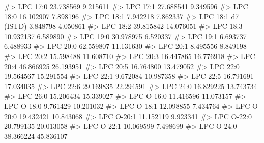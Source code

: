 \documentclass[
  letterpaper,
  DIV=11,
  numbers=noendperiod]{scrreprt}
\newenvironment{Shaded}{\begin{snugshade}}{\end{snugshade}}
\newcommand{\CommentTok}[1]{\textcolor[rgb]{0.37,0.37,0.37}{#1}}
\begin{document}
\begin{Shaded}
\begin{Highlighting}[]
\CommentTok{\#\textgreater{} LPC 17:0                                  23.738569  9.215611}
\CommentTok{\#\textgreater{} LPC 17:1                                  27.688541  9.349596}
\CommentTok{\#\textgreater{} LPC 18:0                                  16.102907  7.898196}
\CommentTok{\#\textgreater{} LPC 18:1                                   7.942218  7.862337}
\CommentTok{\#\textgreater{} LPC 18:1 d7 (ISTD)                         3.848798  4.050861}
\CommentTok{\#\textgreater{} LPC 18:2                                  39.815842 14.076051}
\CommentTok{\#\textgreater{} LPC 18:3                                  10.932137  6.589890}
\CommentTok{\#\textgreater{} LPC 19:0                                  30.978975  6.520337}
\CommentTok{\#\textgreater{} LPC 19:1                                   6.693737  6.488933}
\CommentTok{\#\textgreater{} LPC 20:0                                  62.559807 11.131630}
\CommentTok{\#\textgreater{} LPC 20:1                                   8.495556  8.849198}
\CommentTok{\#\textgreater{} LPC 20:2                                  15.598488 11.608710}
\CommentTok{\#\textgreater{} LPC 20:3                                  16.447865 16.776918}
\CommentTok{\#\textgreater{} LPC 20:4                                  46.866925 26.193951}
\CommentTok{\#\textgreater{} LPC 20:5                                  16.764800 13.479052}
\CommentTok{\#\textgreater{} LPC 22:0                                  19.564567 15.291554}
\CommentTok{\#\textgreater{} LPC 22:1                                   9.672084 10.987358}
\CommentTok{\#\textgreater{} LPC 22:5                                  16.791691 17.034035}
\CommentTok{\#\textgreater{} LPC 22:6                                  29.169835 22.294591}
\CommentTok{\#\textgreater{} LPC 24:0                                  16.829225 13.743734}
\CommentTok{\#\textgreater{} LPC 26:0                                  15.206434 15.339027}
\CommentTok{\#\textgreater{} LPC O{-}16:0                                11.416596 11.073157}
\CommentTok{\#\textgreater{} LPC O{-}18:0                                 9.761429 10.201032}
\CommentTok{\#\textgreater{} LPC O{-}18:1                                12.098855  7.434764}
\CommentTok{\#\textgreater{} LPC O{-}20:0                                19.432421 10.843068}
\CommentTok{\#\textgreater{} LPC O{-}20:1                                11.152119  9.923341}
\CommentTok{\#\textgreater{} LPC O{-}22:0                                20.799135 20.013058}
\CommentTok{\#\textgreater{} LPC O{-}22:1                                10.069599  7.498699}
\CommentTok{\#\textgreater{} LPC O{-}24:0                                38.366224 45.836107}

\end{Highlighting}
\end{Shaded}
\end{document}
